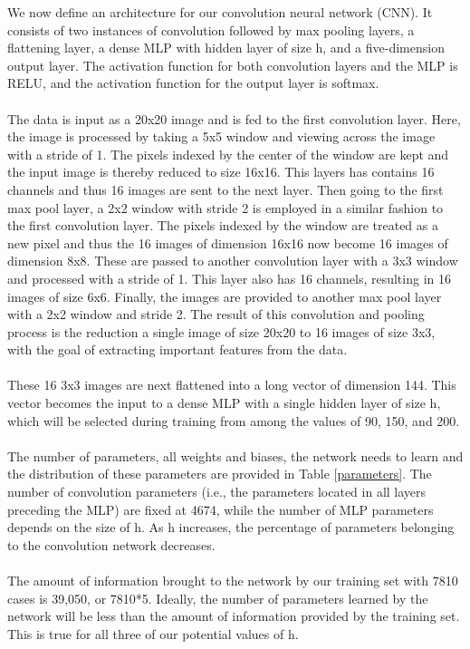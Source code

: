 \documentclass{homework}
\begin{document}
We now define an architecture for our convolution neural network (CNN). It consists of two instances of convolution followed by max pooling layers, a flattening layer, a dense MLP with hidden layer of size h, and a five-dimension output layer. The activation function for both convolution layers and the MLP is RELU, and the activation function for the output layer is softmax.\\\\
The data is input as a 20x20 image and is fed to the first convolution layer. Here, the image is processed by taking a 5x5 window and viewing across the image with a stride of 1. The pixels indexed by the center of the window are kept and the input image is thereby reduced to size 16x16. This layers has contains 16 channels and thus 16 images are sent to the next layer. Then going to the first max pool layer, a 2x2 window with stride 2 is employed in a similar fashion to the first convolution layer. The pixels indexed by the window are treated as a new pixel and thus the 16 images of dimension 16x16 now become 16 images of dimension 8x8. These are passed to another convolution layer with a 3x3 window and processed with a stride of 1. This layer also has 16 channels, resulting in 16 images of size 6x6. Finally, the images are provided to another max pool layer with a 2x2 window and stride 2. The result of this convolution and pooling process is the reduction a single image of size 20x20 to 16 images of size 3x3, with the goal of extracting important features from the data.\\\\
These 16 3x3 images are next flattened into a long vector of dimension 144. This vector becomes the input to a dense MLP with a single hidden layer of size h, which will be selected during training from among the values of 90, 150, and 200.\\\\
The number of parameters, all weights and biases, the network needs to learn and the distribution of these parameters are provided in Table \ref{parameters}. The number of convolution parameters (i.e., the parameters located in all layers preceding the MLP) are fixed at 4674, while the number of MLP parameters depends on the size of h. As h increases, the percentage of parameters belonging to the convolution network decreases.\\\\
The amount of information brought to the network by our training set with 7810 cases is 39,050, or 7810*5. Ideally, the number of parameters learned by the network will be less than the amount of information provided by the training set. This is true for all three of our potential values of h.
\end{document}
